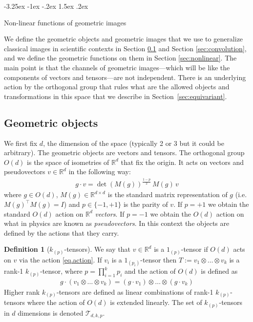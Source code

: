 \documentclass{article}
\makeatletter
\theoremstyle{definition}
\newtheorem{definition}{Definition}
\newcommand{\tensorname}[2]{{#1}_{(#2)}}
\newcommand{\tensor}[2]{$\tensorname{#1}{#2}$-tensor}
\newcommand{\sectionname}{Section}
\renewcommand\section{\@startsection {section}{1}{\z@}%
  {-3.25ex \@plus -1ex \@minus -.2ex}%
  {1.5ex \@plus .2ex}%
  {\raggedright\normalfont\large\bfseries}}%
\makeatother
\begin{document}
\section{Non-linear functions of geometric images}

We define the geometric objects and geometric images that we use to generalize classical images in scientific contexts in \sectionname{} \ref{sec:geometric} and \sectionname{} \ref{sec:convolution}, and we define the geometric functions on them in \sectionname{} \ref{sec:nonlinear}.
The main point is that the channels of geometric images---which will be like the components of vectors and tensors---are not independent.
There is an underlying action by the orthogonal group that rules what are the allowed objects and transformations in this space that we describe in \sectionname{}~\ref{sec:equivariant}. 

\subsection{Geometric objects}\label{sec:geometric}

We first fix $d$, the dimension of the space (typically 2 or 3 but it could be arbitrary).
The geometric objects are vectors and tensors. 
The orthogonal group $O(d)$ is the space of isometries of $\mathbb R^d$ that fix the origin. 
It acts on vectors and pseudovectors $v \in \mathbb R^d$ in the following way:
\begin{align} \label{eq.action}
    g\cdot v = \det(M(g))^{\frac{1-p}{2}}\,M(g)\,v
\end{align}
where $g\in O(d)$, $M(g)\in \mathbb R^{d\times d}$ is the standard matrix representation of $g$ (i.e. $M(g)^\top M(g) = I$) and $p\in\{-1,+1\}$ is the parity of $v$.
If $p=+1$ we obtain the standard $O(d)$ action on $\mathbb R^d$ \emph{vectors}.
If $p=-1$ we obtain the $O(d)$ action on what in physics are known as \emph{pseudovectors}.
In this context the objects are defined by the actions that they carry.

\begin{definition}[\tensor{k}{p}s]\label{def.tensors}
We say that $v\in \mathbb R^d$ is a \tensor{1}{p} if $O(d)$ acts on $v$ via the action \eqref{eq.action}. 
If $v_i$ is a \tensor{1}{p_i} then $T:=v_{1}\otimes\ldots \otimes v_k$ is a rank-1 \tensor{k}{p}, where $p=\prod_{i=1}^k p_i$ and the action of $O(d)$ is defined as
\begin{align}
    g\cdot (v_{1}\otimes\ldots \otimes v_k) = (g\cdot v_1)\otimes \ldots \otimes (g\cdot v_k)
\end{align}
Higher rank \tensor{k}{p}s are defined as linear combinations of rank-1 \tensor{k}{p}s where the action of $O(d)$ is extended linearly. The set of \tensor{k}{p}s in $d$ dimensions is denoted $\mathcal{T}_{d,k,p}$.
\end{definition}
\end{document}
